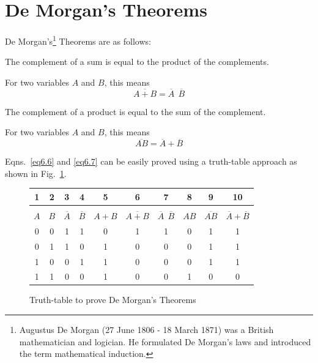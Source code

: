 \section{De Morgan's Theorems}\label{sec6.27}

De Morgan's\footnote[1]{Augustus De Morgan (27 June 1806 - 18 March 1871) was a British mathematician and logician. He formulated De Morgan's laws and introduced the term mathematical induction.} Theorems are as follows:

\begin{thm}\label{thm6.1}
The complement of a sum is equal to the product of the complements.

For two variables $A$ and $B$, this means
\begin{equation}
\overline{A+B}=\overline{A} \ \ \overline{B}\label{eq6.6}
\end{equation}
\end{thm}

\begin{thm}\label{thm6.2}
The complement of a product is equal to the sum of the complement.

For two variables $A$ and $B$, this means
\begin{equation}
\overline{AB}=\overline{A}+\overline{B}\label{eq6.7}
\end{equation}
\end{thm}

Eqns.~\eqref{eq6.6} and \eqref{eq6.7} can be easily proved using a truth-table approach as shown in Fig.~\ref{fig6.26}.
\begin{figure}[H]
\centering
\tabcolsep=6pt
\renewcommand{\arraystretch}{1.2}
\begin{tabular}{|cccccccccc|}
\hline
{\bf 1} & {\bf 2} & {\bf 3} & {\bf 4} & {\bf 5} & {\bf 6} & {\bf 7} & {\bf 8} & {\bf 9} & {\bf 10}\\
\hline
&&&&&&&&&\\[-14pt]
\boldmath$A$ & \boldmath$B$ & \boldmath$\overline{A}$ & \boldmath$\overline{B}$ & \boldmath$A+B$ & \boldmath$\overline{A+B}$ & \boldmath$\overline{A} \ \ \overline{B}$ & \boldmath$AB$ & \boldmath$\overline{AB}$ & \boldmath$\overline{A}+\overline{B}$\\
\hline
0 & 0 & 1 & 1 & 0 & 1 & 1 & 0 & 1 & 1\\
0 & 1 & 1 & 0 & 1 & 0 & 0 & 0 & 1 & 1\\
1 & 0 & 0 & 1 & 1 & 0 & 0 & 0 & 1 & 1\\
1 & 1 & 0 & 0 & 1 & 0 & 0 & 1 & 0 & 0\\
\hline
\end{tabular}
\caption{Truth-table to prove De Morgan's Theorems}\label{fig6.26}
\end{figure}

